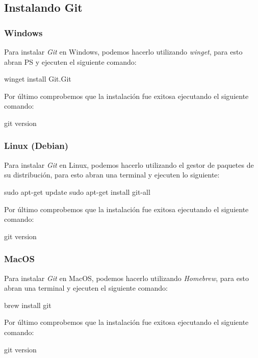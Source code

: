   \subsection{Instalando Git}
    \subsubsection{Windows}
      Para instalar \textit{Git} en Windows, podemos hacerlo utilizando \textit{winget}, para esto
      abran PS y ejecuten el siguiente comando:

      \begin{powershell}
        winget install Git.Git
      \end{powershell}

      Por último comprobemos que la instalación fue exitosa ejecutando el siguiente comando:

      \begin{powershell}
        git version
      \end{powershell}

    \subsubsection{Linux (Debian)}
      Para instalar \textit{Git} en Linux, podemos hacerlo utilizando el gestor de paquetes de su
      distribución, para esto abran una terminal y ejecuten lo siguiente:

      \begin{bash}
        sudo apt-get update
        sudo apt-get install git-all
      \end{bash}

      Por último comprobemos que la instalación fue exitosa ejecutando el siguiente comando:

      \begin{bash}
        git version
      \end{bash}

    \subsubsection{MacOS}
      Para instalar \textit{Git} en MacOS, podemos hacerlo utilizando \textit{Homebrew}, para esto
      abran una terminal y ejecuten el siguiente comando:

      \begin{bash}
        brew install git
      \end{bash}

      Por último comprobemos que la instalación fue exitosa ejecutando el siguiente comando:

      \begin{bash}
        git version
      \end{bash}
